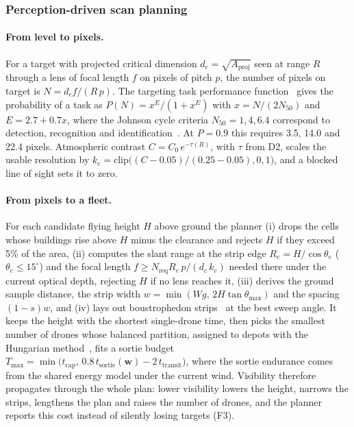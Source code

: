 \subsubsection{Perception-driven scan planning}

\paragraph{From level to pixels.} For a target with projected critical dimension $d_c = \sqrt{A_{\mathrm{proj}}}$
seen at range $R$ through a lens of focal length $f$ on pixels of pitch $p$, the number of pixels on target is
$N = d_c f/(R\,p)$. The targeting task performance function~\cite{vollmerhausen2004new} gives the probability of a task
as $P(N) = x^{E}/(1+x^{E})$ with $x = N/(2N_{50})$ and $E = 2.7 + 0.7x$, where the Johnson cycle criteria
$N_{50} = 1, 4, 6.4$ correspond to detection, recognition and identification~\cite{sjaardema2015history}. At
$P = 0.9$ this requires 3.5, 14.0 and 22.4 pixels. Atmospheric contrast $C = C_0\,e^{-\tau(R)}$, with $\tau$ from D2,
scales the usable resolution by $k_c = \mathrm{clip}\big((C - 0.05)/(0.25 - 0.05), 0, 1\big)$, and a blocked line of
sight sets it to zero.

\paragraph{From pixels to a fleet.} For each candidate flying height $H$ above ground the planner (i) drops the cells
whose buildings rise above $H$ minus the clearance and rejects $H$ if they exceed 5\% of the area, (ii) computes the
slant range at the strip edge $R_e = H/\cos\theta_e$ ($\theta_e \leq 15^{\circ}$) and the focal length
$f \geq N_{\mathrm{req}} R_e\, p/(d_c\, k_c)$ needed there under the current optical depth, rejecting $H$ if no lens
reaches it, (iii) derives the ground sample distance, the strip width $w = \min(W g,\, 2H\tan\theta_{\max})$ and the
spacing $(1-s)w$, and (iv) lays out boustrophedon strips~\cite{choset2000coverage} at the best sweep angle. It keeps the
height with the shortest single-drone time, then picks the smallest number of drones whose balanced partition, assigned
to depots with the Hungarian method~\cite{kuhn1955hungarian}, fits a sortie budget
$T_{\max} = \min\big(t_{\mathrm{cap}},\, 0.8\,t_{\mathrm{sortie}}(\mathbf{w}) - 2\,t_{\mathrm{transit}}\big)$, where the
sortie endurance comes from the shared energy model under the current wind. Visibility therefore propagates through the
whole plan: lower visibility lowers the height, narrows the strips, lengthens the plan and raises the number of drones,
and the planner reports this cost instead of silently losing targets (F3).

